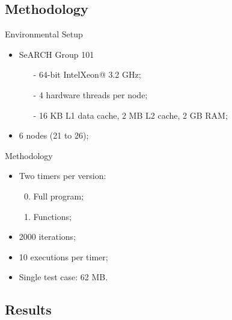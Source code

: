 \documentclass{beamer}
\begin{document}
\subsection{Methodology}
\begin{frame}
	\begin{block}{Environmental Setup}
		\begin{itemize}
			\item{SeARCH Group 101
			\begin{itemize}
				\item[-]{64-bit Intel\textregistered Xeon\texttrademark @ 3.2 GHz;}
				\item[-]{4 hardware threads per node;}
				\item[-]{16 KB L1 data cache, 2 MB L2 cache, 2 GB RAM;}
			\end{itemize}
			}
			\item{6 nodes (21 to 26);}
		\end{itemize}
	\end{block}
	\begin{block}{Methodology}
		\begin{itemize}
			\item{Two timers per version:
			\begin{enumerate}
				\setcounter{enumi}{-1}
				\item{Full program;}
				\item{Functions;}
			\end{enumerate}
			}
			\item{2000 iterations;}
			\item{10 executions per timer;}
			\item{Single test case: 62 MB.}
		\end{itemize}
	\end{block}
\end{frame}



%
%
%
%

\subsection{Results}
%
\end{document}
